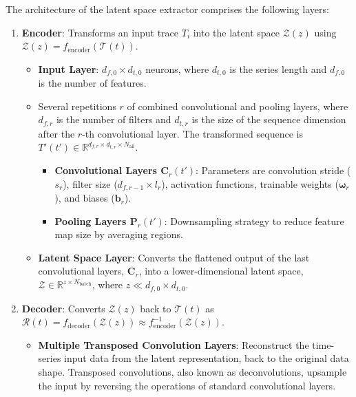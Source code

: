 \documentclass{ieeetmlcn}
\begin{document}
The architecture of the latent space extractor comprises the following layers:
\begin{enumerate}
    \item \textbf{Encoder}: Transforms an input trace $T_i$ into the latent space $\mathcal{Z}(z)$ using $\mathcal{Z}(z) = f_{\text{encoder}}(\mathcal{T}(t))$.
    \begin{itemize}
        \item \textbf{Input Layer}: \(d_{f,0} \times d_{t,0}\) neurons, where \(d_{t,0}\) is the series length and \(d_{f,0}\) is the number of features.
        \item Several repetitions \(r\) of combined convolutional and pooling layers, where \(d_{f,r}\) is the number of filters and \(d_{t,r}\) is the size of the sequence dimension after the \(r\)-th convolutional layer. The transformed sequence is \(T'(t') \in \mathbb{R}^{d_{f,r} \times d_{t,r} \times N_{\text{all}}}\).
        \begin{itemize}
            \item \textbf{Convolutional Layers ${\boldsymbol{C}}_{r}(t')$}: Parameters are convolution stride ($s_r$), filter size ($d_{f,r-1} \times l_r$), activation functions, trainable weights ($\boldsymbol{\omega}_r$), and biases ($\boldsymbol{b}_r$).
            \item \textbf{Pooling Layers $\boldsymbol{P}_r(t')$}: Downsampling strategy to reduce feature map size by averaging regions.
        \end{itemize}
        \item \textbf{Latent Space Layer}: Converts the flattened output of the last convolutional layers, $\boldsymbol{C}_r$, into a lower-dimensional latent space, $\mathcal{Z} \in \mathbb{R}^{z \times N_{\text{batch}}}$, where $z \ll d_{f,0} \times d_{t, 0}$.
    \end{itemize}
    \item \textbf{Decoder}: Converts $\mathcal{Z}(z)$ back to $\mathcal{T}(t)$ as $\mathcal{R}(t) = f_{\text{decoder}}(\mathcal{Z}(z)) \approx f_{\text{encoder}}^{-1}(\mathcal{Z}(z))$.
        \begin{itemize}
            \item \textbf{Multiple Transposed Convolution Layers}: Reconstruct the time-series input data from the latent representation, back to the original data shape. Transposed convolutions, also known as deconvolutions, upsample the input by reversing the operations of standard convolutional layers.
        \end{itemize}
\end{enumerate}
\end{document}
